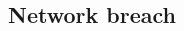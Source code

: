 \documentclass[twosided,a4,10pt]{article}
\begin{document}
\begin{multicols}{2}
\subsection{Network breach}
 \lipsum[1]










 
 

 
 


\end{multicols}
\end{document}

